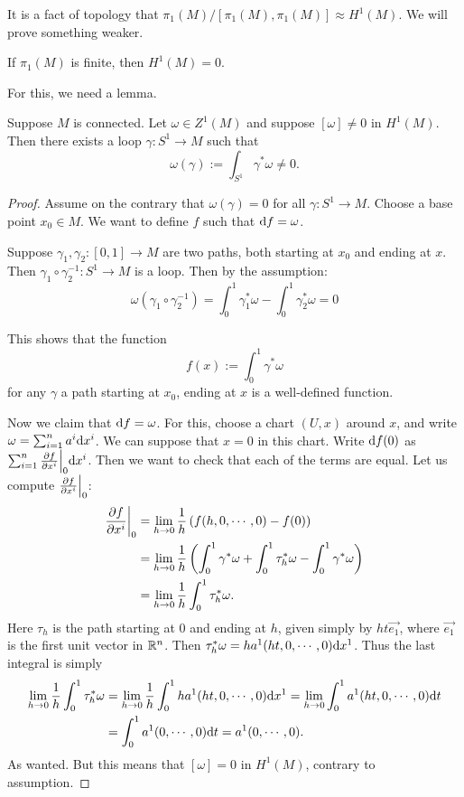 \documentclass[11pt, english]{article}
\begin{document}
It is a fact of topology that $\pi_1(M)/[\pi_1(M),\pi_1(M)] \approx H^1(M)$. We will prove something weaker.
\begin{prop}
If $\pi_1(M)$ is finite, then $H^1(M)=0$.
\end{prop}
For this, we need a lemma.
\begin{lemma}
  Suppose $M$ is connected. Let $\omega \in Z^1(M)$ and suppose $[\omega] \neq 0$ in $H^1(M)$. Then there exists a loop $\gamma:S^1 \to M$ such that
\[
\omega(\gamma) := \int_{S^1} \gamma^\ast \omega \neq 0.
\]
\end{lemma}
\begin{proof}
Assume on the contrary that $\omega(\gamma)=0$ for all $\gamma:S^1\to M$. Choose a base point $x_0 \in M$. We want to define $f$ such that $\mathrm{d}{f}=\omega$.

Suppose $\gamma_1,\gamma_2:[0,1] \to M$ are two paths, both starting at $x_0$ and ending at $x$. Then $\gamma_1 \circ \gamma_2^{-1}:S^1 \to M$ is a loop. Then by the assumption:\[ \omega(\gamma_1 \circ \gamma_ 2^{-1})=\int_0^1 \gamma_1^\ast \omega - \int_0^1 \gamma_2 ^\ast \omega = 0 \]

This shows that the function
\[
f(x) := \int_0^1 \gamma^\ast \omega
\]
for any $\gamma$ a path starting at $x_0$, ending at $x$ is a well-defined function.

Now we claim that $\mathrm{d}{f} = \omega$. For this, choose a chart $(U,x)$ around $x$, and write $\omega = \sum_{i=1}^n a^i \mathrm{d}{x}^i$. We can suppose that $x=0$ in this chart. Write $\mathrm{d}{f}(0) $ as $\sum_{i=1}^n \restr{\dd{f}{x^i}}{0} \d x^i$. Then we want to check that each of the terms are equal. Let us compute $\restr{\dd{f}{x^i}}{0}$:
\begin{align*}
\restr{\dd{f}{x^i}}{0} &= \lim_{h \to 0} \frac 1h \left( f(h,0,\cdots,0)-f(0) \right) \\
&= \lim_{h \to 0} \frac 1h \left( \int_0^1 \gamma^\ast \omega + \int_0^1 \tau_h^\ast \omega -\int_0^1 \gamma^\ast \omega \right) \\
&= \lim_{h \to 0} \frac 1h \int_0^1 \tau_h^\ast \omega .
\end{align*}
Here $\tau_h$ is the path starting at $0$ and ending at $h$, given simply by $ht\vec{e_1}$, where $\vec{e_1}$ is the first unit vector in $\mathbb{R}^n$. Then $\tau_h^\ast \omega = h a^1(ht,0,\cdots,0) \mathrm{d}{x}^1$. Thus the last integral is simply
\begin{align*}
\lim_{h \to 0} \frac 1h \int_0^1 \tau_h^\ast \omega &=  \lim_{h \to 0} \frac 1h \int_0^1h a^1(ht,0,\cdots,0) \mathrm{d}{x}^1 = \lim_{h \to 0} \int_0^1 a^1(ht,0,\cdots,0) \mathrm{d}{t} \\
&= \int_0^1 a^1(0,\cdots,0) \mathrm{d}{t} = a^1(0,\cdots,0).
\end{align*}
As wanted. But this means that $[\omega] = 0$ in $H^1(M)$, contrary to assumption.
\end{proof}
\end{document}
